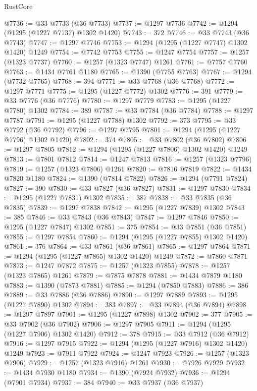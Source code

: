 \begin{lexlean}{RustCore}
\begin{coremodule}
@7736 := @33 @7733 (@36 @7733)
@7737 := @1297 @7736
@7742 := @1294 (@1295 (@1227 @7737) @1302 @1420)
@7743 := 372
@7746 := @33 @7743 (@36 @7743)
@7747 := @1297 @7746
@7753 := @1294 (@1295 (@1227 @7747) @1302 @1420) @1249
@7754 := @7742 @7753
@7755 := @1247 @7754
@7757 := @1257 (@1323 @7737)
@7760 := @1257 (@1323 @7747) @1261
@7761 := @7757 @7760
@7763 := @1434 @7761 @1180
@7765 := @1390 (@7755 @7763)
@7767 := @1294 (@7732 @7765)
@7768 := 394
@7771 := @33 @7768 (@36 @7768)
@7772 := @1297 @7771
@7775 := @1295 (@1227 @7772) @1302
@7776 := 391
@7779 := @33 @7776 (@36 @7776)
@7780 := @1297 @7779
@7783 := @1295 (@1227 @7780) @1302
@7784 := 389
@7787 := @33 @7784 (@36 @7784)
@7788 := @1297 @7787
@7791 := @1295 (@1227 @7788) @1302
@7792 := 373
@7795 := @33 @7792 (@36 @7792)
@7796 := @1297 @7795
@7801 := @1294 (@1295 (@1227 @7796) @1302 @1420)
@7802 := 374
@7805 := @33 @7802 (@36 @7802)
@7806 := @1297 @7805
@7812 := @1294 (@1295 (@1227 @7806) @1302 @1420) @1249
@7813 := @7801 @7812
@7814 := @1247 @7813
@7816 := @1257 (@1323 @7796)
@7819 := @1257 (@1323 @7806) @1261
@7820 := @7816 @7819
@7822 := @1434 @7820 @1180
@7824 := @1390 (@7814 @7822)
@7826 := @1294 (@7791 @7824)
@7827 := 390
@7830 := @33 @7827 (@36 @7827)
@7831 := @1297 @7830
@7834 := @1295 (@1227 @7831) @1302
@7835 := 387
@7838 := @33 @7835 (@36 @7835)
@7839 := @1297 @7838
@7842 := @1295 (@1227 @7839) @1302
@7843 := 385
@7846 := @33 @7843 (@36 @7843)
@7847 := @1297 @7846
@7850 := @1295 (@1227 @7847) @1302
@7851 := 375
@7854 := @33 @7851 (@36 @7851)
@7855 := @1297 @7854
@7860 := @1294 (@1295 (@1227 @7855) @1302 @1420)
@7861 := 376
@7864 := @33 @7861 (@36 @7861)
@7865 := @1297 @7864
@7871 := @1294 (@1295 (@1227 @7865) @1302 @1420) @1249
@7872 := @7860 @7871
@7873 := @1247 @7872
@7875 := @1257 (@1323 @7855)
@7878 := @1257 (@1323 @7865) @1261
@7879 := @7875 @7878
@7881 := @1434 @7879 @1180
@7883 := @1390 (@7873 @7881)
@7885 := @1294 (@7850 @7883)
@7886 := 386
@7889 := @33 @7886 (@36 @7886)
@7890 := @1297 @7889
@7893 := @1295 (@1227 @7890) @1302
@7894 := 383
@7897 := @33 @7894 (@36 @7894)
@7898 := @1297 @7897
@7901 := @1295 (@1227 @7898) @1302
@7902 := 377
@7905 := @33 @7902 (@36 @7902)
@7906 := @1297 @7905
@7911 := @1294 (@1295 (@1227 @7906) @1302 @1420)
@7912 := 378
@7915 := @33 @7912 (@36 @7912)
@7916 := @1297 @7915
@7922 := @1294 (@1295 (@1227 @7916) @1302 @1420) @1249
@7923 := @7911 @7922
@7924 := @1247 @7923
@7926 := @1257 (@1323 @7906)
@7929 := @1257 (@1323 @7916) @1261
@7930 := @7926 @7929
@7932 := @1434 @7930 @1180
@7934 := @1390 (@7924 @7932)
@7936 := @1294 (@7901 @7934)
@7937 := 384
@7940 := @33 @7937 (@36 @7937)

\end{coremodule}
\end{lexlean}
